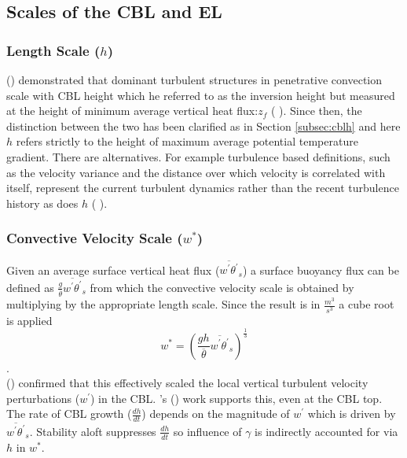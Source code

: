 \subsection{Scales of the \acs{CBL} and \acs{EL}}
\label{subsec:scales}

\subsubsection{Length Scale ($h$)}
\label{subsubsec:}

\citeauthor{Deardorff72} (\citeyear{Deardorff72}) demonstrated that dominant turbulent structures in penetrative convection scale with \acs{CBL} height which he referred to as the inversion height but measured at the height of minimum average vertical heat flux:$z_{f}$ (\citeauthor{DearWill80} \citeyear{DearWill80}).  Since then, the distinction between the two has been clarified as in Section \ref{subsec:cblh} and here $h$ refers strictly to the height of maximum average potential temperature gradient. There are alternatives. For example turbulence based definitions, such as the velocity variance and the distance over which velocity is correlated with itself, represent the current turbulent dynamics rather than the recent turbulence history as does $h$ (\citeauthor{Traum11} \citeyear{Traum11}).\\

\subsubsection{Convective Velocity Scale ($w^{*}$)}
\label{subsubsec:convel}

Given an average surface vertical heat flux ($\overline{w^{'}\theta^{'}}_{s}$) a surface buoyancy flux can be defined as 
$\frac{g}{\overline{\theta}}\overline{w^{'}\theta^{'}}_{s}$ from which the convective velocity scale is obtained by
multiplying by the appropriate length scale.  Since the result is in $\frac{m^{3}}{s^{3}}$ a cube root is applied\\

\begin{equation}
w^{*} = \left( \frac{gh}{\overline{\theta}}\overline{w^{'}\theta^{'}}_{s} \right)^{\frac{1}{3}}
\end{equation}.\\

\citeauthor{Deardorff70} (\citeyear{Deardorff70}) confirmed that this effectively scaled the local vertical turbulent velocity perturbations ($w^{'}$) in the \acs{CBL}.  \citeauthor{Sorbjan}'s (\citeyear{Sorbjan}) work supports this, even at the \acs{CBL} top.  The rate of \acs{CBL} growth ($\frac{dh}{dt}$) depends on the magnitude of $w^{'}$ which is driven by $\overline{w^{'}\theta^{'}}_{s}$. Stability aloft suppresses $\frac{dh}{dt}$ so influence of $\gamma$ is indirectly accounted for via $h$ in $w^{*}$.\\

